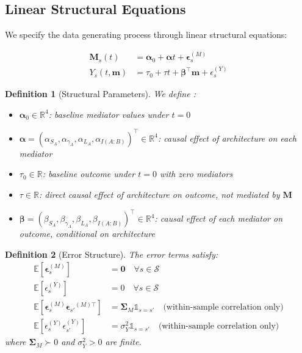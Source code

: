 \documentclass[
    reprint,
    amsmath, amssymb,
    aps,
    floatfix,
    nofootinbib
]{revtex4-1}
\newtheorem{definition}{Definition}
\begin{document}
\subsection{Linear Structural Equations}

We specify the data generating process through linear structural equations:

\begin{align}
    \bm{M}_s(t) &= \bm{\alpha}_0 + \bm{\alpha} t + \bm{\epsilon}_s^{(M)} \label{eq:sem_mediator}\\
    Y_s(t, \bm{m}) &= \tau_0 + \tau t + \bm{\beta}^\top \bm{m} + \epsilon_s^{(Y)} \label{eq:sem_outcome}
\end{align}

\begin{definition}[Structural Parameters] We define : 

\begin{itemize}
    \item $\bm{\alpha}_0 \in \mathbb{R}^4$: baseline mediator values under $t=0$
    \item $\bm{\alpha} = (\alpha_{S_A}, \alpha_{\gamma_A}, \alpha_{L_A}, \alpha_{I(A:B)})^\top \in \mathbb{R}^4$: causal effect of architecture on each mediator
    \item $\tau_0 \in \mathbb{R}$: baseline outcome under $t=0$ with zero mediators
    \item $\tau \in \mathbb{R}$: direct causal effect of architecture on outcome, not mediated by $\bm{M}$
    \item $\bm{\beta} = (\beta_{S_A}, \beta_{\gamma_A}, \beta_{L_A}, \beta_{I(A:B)})^\top \in \mathbb{R}^4$: causal effect of each mediator on outcome, conditional on architecture
\end{itemize}
\end{definition}

\begin{definition}[Error Structure]
The error terms satisfy:
\begin{align}
    \mathbb{E}[\bm{\epsilon}_s^{(M)}] &= \bm{0} \quad \forall s \in \mathcal{S}\label{eq:errorM} \\
    \mathbb{E}[\epsilon_s^{(Y)}] &= 0 \quad \forall s \in \mathcal{S} \label{errorY}\\
    \mathbb{E}[\bm{\epsilon}_s^{(M)} {\bm{\epsilon}_{s'}}^{(M)\top}] &= \bm{\Sigma}_M \mathbb{1}_{s=s'} \quad \text{(within-sample correlation only)} \\
    \mathbb{E}[\epsilon_s^{(Y)} \epsilon_{s'}^{(Y)}] &= \sigma_Y^2 \mathbb{1}_{s=s'} \quad \text{(within-sample correlation only)}
\end{align}
where $\bm{\Sigma}_M \succ 0$ and $\sigma_Y^2 > 0$ are finite.
\end{definition}
\end{document}
